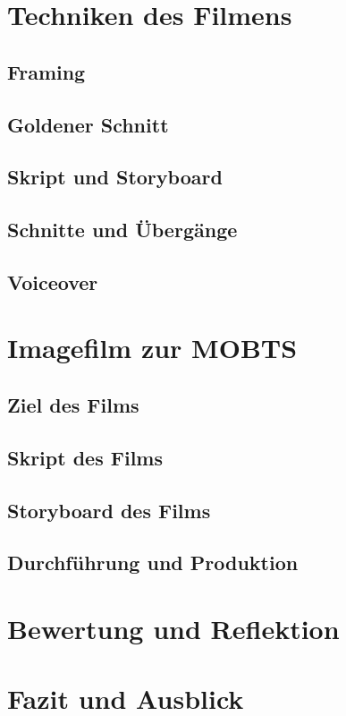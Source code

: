 \section{Techniken des Filmens}
\subsection{Framing}
\subsection{Goldener Schnitt}
\subsection{Skript und Storyboard}
\subsection{Schnitte und Übergänge}
\subsection{Voiceover}
\section{Imagefilm zur MOBTS}
\subsection{Ziel des Films}
\subsection{Skript des Films}
\subsection{Storyboard des Films}
\subsection{Durchführung und Produktion}
\section{Bewertung und Reflektion}
\section{Fazit und Ausblick}